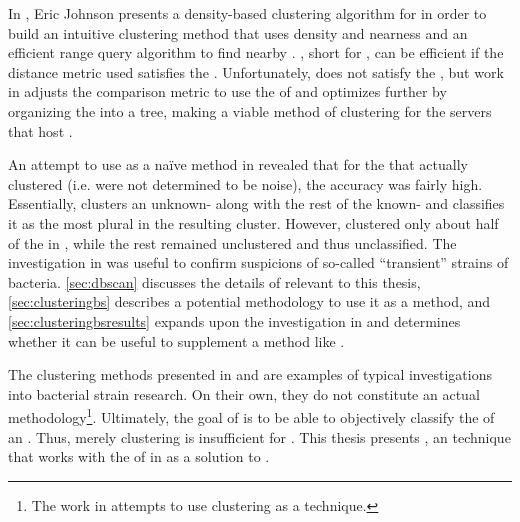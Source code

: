 In \cite{johnson2015density}, Eric Johnson presents a density-based clustering algorithm for \pyros{} in order to build an intuitive clustering method that uses density and nearness and an efficient range query algorithm to find nearby \isols{}.
\dbscan{} \cite{ester1996density}, short for \dbscanlong{}, can be efficient if the distance metric used satisfies the \trieq{}.
Unfortunately, \pearson{} does not satisfy the \trieq{}, but work in \cite{johnson2015density} adjusts the comparison metric to use the \euclid{} of \zscores{} and optimizes further by organizing the \pyros{} into a tree, making \dbscan{} a viable method of clustering for the servers that host \cplop{}.

An attempt to use \cite{johnson2015density} as a na{\"i}ve \mst{} method in \cite{DBLP:conf/bcb/McGovernJDBKV16} revealed that for the \isols{} that actually clustered (i.e. were not determined to be noise), the accuracy was fairly high.
Essentially, \cite{DBLP:conf/bcb/McGovernJDBKV16} clusters an unknown-\spec{} \isol{} along with the rest of the known-\spec{} \isols{} \cplop{} and classifies it as the most plural \spec{} in the resulting cluster.
However, \cite{johnson2015density} clustered only about half of the \isols{} in \cplop{}, while the rest remained unclustered and thus unclassified.
The investigation in \cite{DBLP:conf/bcb/McGovernJDBKV16} was useful to confirm suspicions of so-called ``transient'' strains of \ecoli{} bacteria.
\autoref{sec:dbscan} discusses the details of \cite{johnson2015density} relevant to this thesis, \autoref{sec:clusteringbs} describes a potential methodology to use it as a \mst{} method, and \autoref{sec:clusteringbsresults} expands upon the investigation in \cite{DBLP:conf/bcb/McGovernJDBKV16} and determines whether it can be useful to supplement a \mst{} method like \krap{}.

The clustering methods presented in \cite{DBLP:conf/bibm/MontanaDNBK11, montana2012investigating, SolimanDVMBNWKG12, montana2013ontological, montana2013algorithms} and \cite{johnson2015density} are examples of typical investigations into bacterial strain research.
On their own, they do not constitute an actual \mst{} methodology\footnote{The work in \cite{DBLP:conf/bcb/McGovernJDBKV16} attempts to use clustering as a \mst{} technique.}.
Ultimately, the goal of \cplop{} is to be able to objectively classify the \spec{} of an \ecoli{} \isol{}.
Thus, merely clustering \isols{} is insufficient for \mst{}.
This thesis presents \krap{}, an \mst{} technique that works with the \pyros{} of \isols{} in \cplop{} as a solution to \mst{}.

